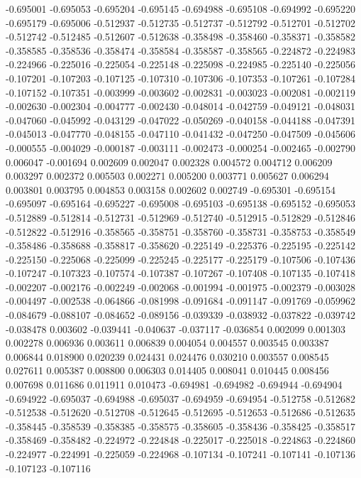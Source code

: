 -0.695001
-0.695053
-0.695204
-0.695145
-0.694988
-0.695108
-0.694992
-0.695220
-0.695179
-0.695006
-0.512937
-0.512735
-0.512737
-0.512792
-0.512701
-0.512702
-0.512742
-0.512485
-0.512607
-0.512638
-0.358498
-0.358460
-0.358371
-0.358582
-0.358585
-0.358536
-0.358474
-0.358584
-0.358587
-0.358565
-0.224872
-0.224983
-0.224966
-0.225016
-0.225054
-0.225148
-0.225098
-0.224985
-0.225140
-0.225056
-0.107201
-0.107203
-0.107125
-0.107310
-0.107306
-0.107353
-0.107261
-0.107284
-0.107152
-0.107351
-0.003999
-0.003602
-0.002831
-0.003023
-0.002081
-0.002119
-0.002630
-0.002304
-0.004777
-0.002430
-0.048014
-0.042759
-0.049121
-0.048031
-0.047060
-0.045992
-0.043129
-0.047022
-0.050269
-0.040158
-0.044188
-0.047391
-0.045013
-0.047770
-0.048155
-0.047110
-0.041432
-0.047250
-0.047509
-0.045606
-0.000555
-0.004029
-0.000187
-0.003111
-0.002473
-0.000254
-0.002465
-0.002790
0.006047
-0.001694
0.002609
0.002047
0.002328
0.004572
0.004712
0.006209
0.003297
0.002372
0.005503
0.002271
0.005200
0.003771
0.005627
0.006294
0.003801
0.003795
0.004853
0.003158
0.002602
0.002749
-0.695301
-0.695154
-0.695097
-0.695164
-0.695227
-0.695008
-0.695103
-0.695138
-0.695152
-0.695053
-0.512889
-0.512814
-0.512731
-0.512969
-0.512740
-0.512915
-0.512829
-0.512846
-0.512822
-0.512916
-0.358565
-0.358751
-0.358760
-0.358731
-0.358753
-0.358549
-0.358486
-0.358688
-0.358817
-0.358620
-0.225149
-0.225376
-0.225195
-0.225142
-0.225150
-0.225068
-0.225099
-0.225245
-0.225177
-0.225179
-0.107506
-0.107436
-0.107247
-0.107323
-0.107574
-0.107387
-0.107267
-0.107408
-0.107135
-0.107418
-0.002207
-0.002176
-0.002249
-0.002068
-0.001994
-0.001975
-0.002379
-0.003028
-0.004497
-0.002538
-0.064866
-0.081998
-0.091684
-0.091147
-0.091769
-0.059962
-0.084679
-0.088107
-0.084652
-0.089156
-0.039339
-0.038932
-0.037822
-0.039742
-0.038478
0.003602
-0.039441
-0.040637
-0.037117
-0.036854
0.002099
0.001303
0.002278
0.006936
0.003611
0.006839
0.004054
0.004557
0.003545
0.003387
0.006844
0.018900
0.020239
0.024431
0.024476
0.030210
0.003557
0.008545
0.027611
0.005387
0.008800
0.006303
0.014405
0.008041
0.010445
0.008456
0.007698
0.011686
0.011911
0.010473
-0.694981
-0.694982
-0.694944
-0.694904
-0.694922
-0.695037
-0.694988
-0.695037
-0.694959
-0.694954
-0.512758
-0.512682
-0.512538
-0.512620
-0.512708
-0.512645
-0.512695
-0.512653
-0.512686
-0.512635
-0.358445
-0.358539
-0.358385
-0.358575
-0.358605
-0.358436
-0.358425
-0.358517
-0.358469
-0.358482
-0.224972
-0.224848
-0.225017
-0.225018
-0.224863
-0.224860
-0.224977
-0.224991
-0.225059
-0.224968
-0.107134
-0.107241
-0.107141
-0.107136
-0.107123
-0.107116
